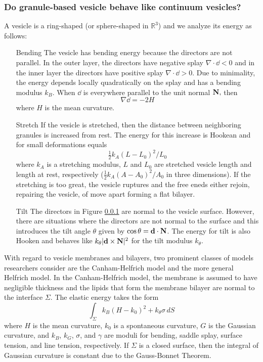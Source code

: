 \subsubsection{Do granule-based vesicle behave like continuum vesicles?}
A vesicle is a ring-shaped (or sphere-shaped in $\mathbb{R}^3$) 
and we analyze its energy as follows:
\begin{enumerate}
\item[Bending]
  The vesicle has bending energy because the directors are not
  parallel.  In the outer layer, the directors have negative
  splay $\nabla \cdot \dd < 0$ and in the inner layer
  the directors have positive splay $\nabla \cdot \dd > 0$.
  Due to minimality, the energy depends locally quadratically
  on the splay and has a bending modulus $k_B$.
  When $\dd$ is everywhere parallel to the unit normal $\mathbf{N},$ then
  \[
  \nabla \dd = -2H
  \]
  where $H$ is the mean curvature. 
\item[Stretch]
  If the vesicle is stretched, then the distance between
  neighboring granules is increased from rest.  The energy
  for this increase is Hookean and for small deformations
  equals
  \begin{equation}
    \label{eq:stretch}
    \tfrac{1}{2}k_A(L - L_0)^2/L_0
  \end{equation}
  where $k_A$ is a stretching modulus, $L$ and $L_0$ are stretched
  vesicle length and length at rest, respectively
  ($\tfrac{1}{2}k_A(A - A_0)^2/A_0$ in three dimensions).
  If the stretching is too great, the vesicle ruptures
  and the free eneds either rejoin, repairing the vesicle,
  of move apart forming a flat bilayer.
\item[Tilt]
  The directors in Figure \ref{} are normal to the vesicle surface.
  However, there are situations where the directors are not normal
  to the surface and this introduces the tilt angle $\theta$
  given by $\cos \theta = \mathbf{d} \cdot \mathbf{N}$.
  The energy for tilt is also Hooken and behaves like
  $k_{\theta}|\mathbf{d} \times \mathbf{N}|^2$ for the tilt modulus $k_{\theta}$.
\end{enumerate}

With regard to vesicle membranes and bilayers, two prominent 
classes of models researchers consider are the
Canham-Helfrich model and the more general Helfrich model.
In the Canham-Helfrich model, the membrane is assumed to have
negligible thickness and the lipids that form the membrane bilayer
are normal to the interface $\Sigma$.  The elastic energy takes the form
\begin{equation}
\label{eq:Canham-Helfrich}
  \int_{\Sigma} k_B(H - k_0)^2 + k_{\theta} \sigma\, dS 
\end{equation}
where $H$ is the mean curvature, $k_0$ is a spontaneous curvature,
$G$ is the Gaussian curvature, and $k_B$, $k_G$, $\sigma$, and $\gamma$ are
moduli for bending, saddle splay, surface tension, and line tension, respectively. 
If $\Sigma$ is a closed surface, then the integral
of Gaussian curvature is constant due to the Gauss-Bonnet Theorem.

